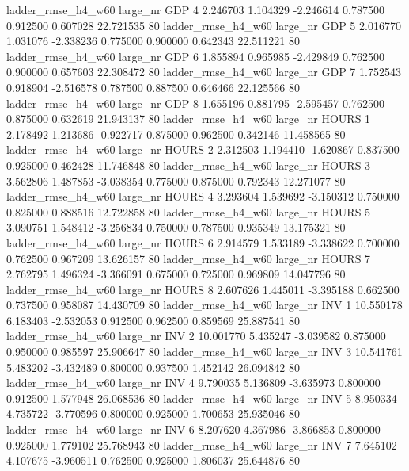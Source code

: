  ladder_rmse_h4_w60   large_nr      GDP                 4  2.246703  1.104329  -2.246614 0.787500 0.912500  0.607028   22.721535 80
 ladder_rmse_h4_w60   large_nr      GDP                 5  2.016770  1.031076  -2.338236 0.775000 0.900000  0.642343   22.511221 80
 ladder_rmse_h4_w60   large_nr      GDP                 6  1.855894  0.965985  -2.429849 0.762500 0.900000  0.657603   22.308472 80
 ladder_rmse_h4_w60   large_nr      GDP                 7  1.752543  0.918904  -2.516578 0.787500 0.887500  0.646466   22.125566 80
 ladder_rmse_h4_w60   large_nr      GDP                 8  1.655196  0.881795  -2.595457 0.762500 0.875000  0.632619   21.943137 80
 ladder_rmse_h4_w60   large_nr    HOURS                 1  2.178492  1.213686  -0.922717 0.875000 0.962500  0.342146   11.458565 80
 ladder_rmse_h4_w60   large_nr    HOURS                 2  2.312503  1.194410  -1.620867 0.837500 0.925000  0.462428   11.746848 80
 ladder_rmse_h4_w60   large_nr    HOURS                 3  3.562806  1.487853  -3.038354 0.775000 0.875000  0.792343   12.271077 80
 ladder_rmse_h4_w60   large_nr    HOURS                 4  3.293604  1.539692  -3.150312 0.750000 0.825000  0.888516   12.722858 80
 ladder_rmse_h4_w60   large_nr    HOURS                 5  3.090751  1.548412  -3.256834 0.750000 0.787500  0.935349   13.175321 80
 ladder_rmse_h4_w60   large_nr    HOURS                 6  2.914579  1.533189  -3.338622 0.700000 0.762500  0.967209   13.626157 80
 ladder_rmse_h4_w60   large_nr    HOURS                 7  2.762795  1.496324  -3.366091 0.675000 0.725000  0.969809   14.047796 80
 ladder_rmse_h4_w60   large_nr    HOURS                 8  2.607626  1.445011  -3.395188 0.662500 0.737500  0.958087   14.430709 80
 ladder_rmse_h4_w60   large_nr      INV                 1 10.550178  6.183403  -2.532053 0.912500 0.962500  0.859569   25.887541 80
 ladder_rmse_h4_w60   large_nr      INV                 2 10.001770  5.435247  -3.039582 0.875000 0.950000  0.985597   25.906647 80
 ladder_rmse_h4_w60   large_nr      INV                 3 10.541761  5.483202  -3.432489 0.800000 0.937500  1.452142   26.094842 80
 ladder_rmse_h4_w60   large_nr      INV                 4  9.790035  5.136809  -3.635973 0.800000 0.912500  1.577948   26.068536 80
 ladder_rmse_h4_w60   large_nr      INV                 5  8.950334  4.735722  -3.770596 0.800000 0.925000  1.700653   25.935046 80
 ladder_rmse_h4_w60   large_nr      INV                 6  8.207620  4.367986  -3.866853 0.800000 0.925000  1.779102   25.768943 80
 ladder_rmse_h4_w60   large_nr      INV                 7  7.645102  4.107675  -3.960511 0.762500 0.925000  1.806037   25.644876 80
